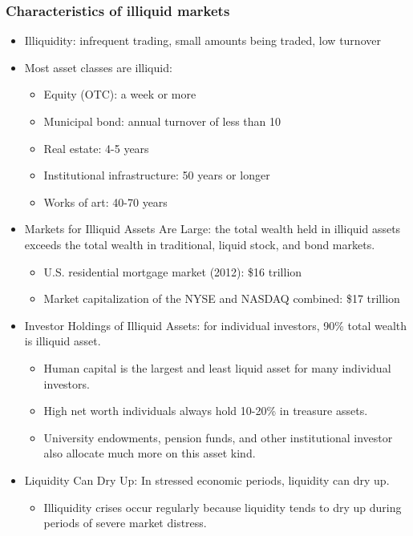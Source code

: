 \subsubsection{Characteristics of illiquid markets}
\begin{itemize}
\item Illiquidity: infrequent trading, small amounts being traded, low turnover
\item Most asset classes are illiquid:
    \begin{itemize}
    \item Equity (OTC): a week or more
    \item Municipal bond: annual turnover of less than 10%
    \item Real estate: 4-5 years
    \item Institutional infrastructure: 50 years or longer
    \item Works of art: 40-70 years
    \end{itemize}
    
\item Markets for Illiquid Assets Are Large: the total wealth held in illiquid assets exceeds the total wealth in traditional, liquid stock, and bond markets.
    \begin{itemize}
    \item U.S. residential mortgage market (2012): \$16 trillion
    \item Market capitalization of the NYSE and NASDAQ combined: \$17 trillion
    \end{itemize}
    
\item Investor Holdings of Illiquid Assets: for individual investors, 90\% total wealth is illiquid asset.
    \begin{itemize}
    \item Human capital is the largest and least liquid asset for many individual investors.
    \item High net worth individuals always hold 10-20\% in treasure assets.
    \item University endowments, pension funds, and other institutional investor also allocate much more on this asset kind.
    \end{itemize}
    
\item Liquidity Can Dry Up: In stressed economic periods, liquidity can dry up.
    \begin{itemize}
    \item Illiquidity crises occur regularly because liquidity tends to dry up during periods of severe market distress.
    \end{itemize}
    

\end{itemize}



